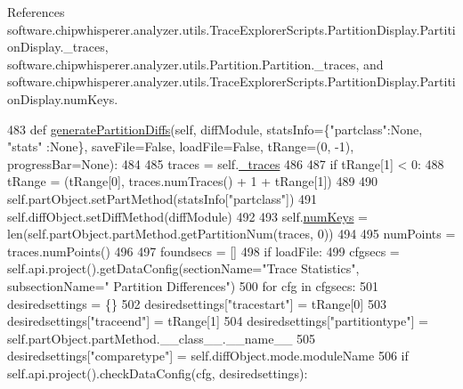 References software.\+chipwhisperer.\+analyzer.\+utils.\+Trace\+Explorer\+Scripts.\+Partition\+Display.\+Partition\+Display.\+\_\+traces, software.\+chipwhisperer.\+analyzer.\+utils.\+Partition.\+Partition.\+\_\+traces, and software.\+chipwhisperer.\+analyzer.\+utils.\+Trace\+Explorer\+Scripts.\+Partition\+Display.\+Partition\+Display.\+num\+Keys.


\begin{DoxyCode}
483     \textcolor{keyword}{def }\hyperlink{classsoftware_1_1chipwhisperer_1_1analyzer_1_1utils_1_1TraceExplorerScripts_1_1PartitionDisplay_1_1PartitionDisplay_a979a52b8fe95d8ec94365c5a334af5f6}{generatePartitionDiffs}(self, diffModule, statsInfo=\{"partclass":None, \textcolor{stringliteral}{"stats"}
      :\textcolor{keywordtype}{None}\}, saveFile=\textcolor{keyword}{False}, loadFile=\textcolor{keyword}{False}, tRange=(0, -1), progressBar=\textcolor{keywordtype}{None}):
484 
485         traces = self.\hyperlink{classsoftware_1_1chipwhisperer_1_1analyzer_1_1utils_1_1TraceExplorerScripts_1_1PartitionDisplay_1_1PartitionDisplay_a62522467fca010c0a3bcfaf24adf2a99}{\_traces}
486 
487         \textcolor{keywordflow}{if} tRange[1] < 0:
488             tRange = (tRange[0], traces.numTraces() + 1 + tRange[1])
489 
490         self.partObject.setPartMethod(statsInfo[\textcolor{stringliteral}{"partclass"}])
491         self.diffObject.setDiffMethod(diffModule)
492 
493         self.\hyperlink{classsoftware_1_1chipwhisperer_1_1analyzer_1_1utils_1_1TraceExplorerScripts_1_1PartitionDisplay_1_1PartitionDisplay_a9609f827035095f248787dbde121fa08}{numKeys} = len(self.partObject.partMethod.getPartitionNum(traces, 0))
494 
495         numPoints = traces.numPoints()
496 
497         foundsecs = []
498         \textcolor{keywordflow}{if} loadFile:
499             cfgsecs = self.api.project().getDataConfig(sectionName=\textcolor{stringliteral}{"Trace Statistics"}, subsectionName=\textcolor{stringliteral}{"
      Partition Differences"})
500             \textcolor{keywordflow}{for} cfg \textcolor{keywordflow}{in} cfgsecs:
501                 desiredsettings = \{\}
502                 desiredsettings[\textcolor{stringliteral}{"tracestart"}] = tRange[0]
503                 desiredsettings[\textcolor{stringliteral}{"traceend"}] = tRange[1]
504                 desiredsettings[\textcolor{stringliteral}{"partitiontype"}] = self.partObject.partMethod.\_\_class\_\_.\_\_name\_\_
505                 desiredsettings[\textcolor{stringliteral}{"comparetype"}] = self.diffObject.mode.moduleName
506                 \textcolor{keywordflow}{if} self.api.project().checkDataConfig(cfg, desiredsettings):

\end{DoxyCode}

